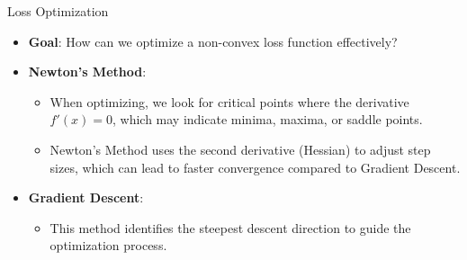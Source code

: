 \documentclass[serif, aspectratio=169]{beamer}
\begin{document}
\begin{frame}{Loss Optimization}
    \begin{itemize}
        \item \textbf{Goal}: How can we optimize a non-convex loss function effectively?
        \item \textbf{Newton's Method}:
        \begin{itemize}
            \item When optimizing, we look for critical points where the derivative \( f'(x) = 0 \), which may indicate minima, maxima, or saddle points.
            \item Newton's Method uses the second derivative (Hessian) to adjust step sizes, which can lead to faster convergence compared to Gradient Descent.
        \end{itemize}
        \item \textbf{Gradient Descent}:
        \begin{itemize}
            \item This method identifies the steepest descent direction to guide the optimization process.
        \end{itemize}
    \end{itemize}
\end{frame}
\end{document}

